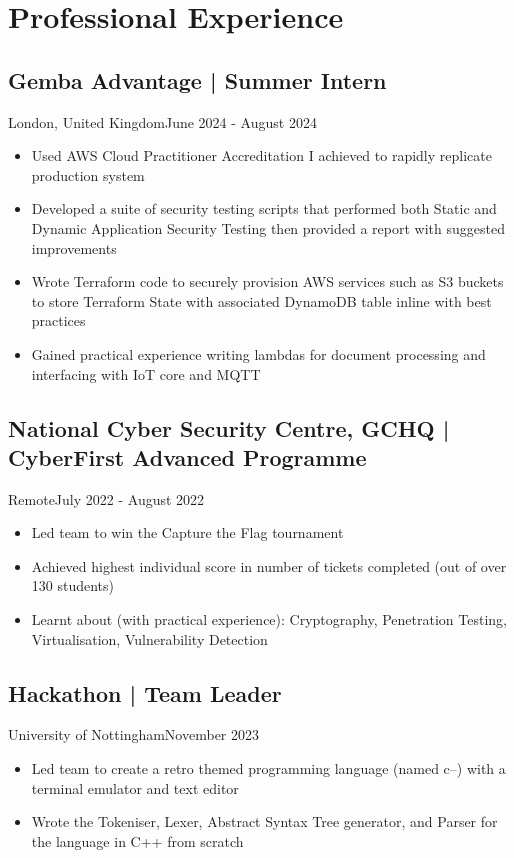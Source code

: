 \section{Professional Experience}
\subsection{Gemba Advantage | Summer Intern}{London, United Kingdom}{June 2024 - August 2024}
\begin{itemize}
    \item Used AWS Cloud Practitioner Accreditation I achieved to rapidly replicate production system
    \item Developed a suite of security testing scripts that performed both Static and Dynamic Application Security Testing then provided a report with suggested improvements
    \item Wrote Terraform code to securely provision AWS services such as S3 buckets to store Terraform State with associated DynamoDB table inline with best practices
    \item Gained practical experience writing lambdas for document processing and interfacing with IoT core and MQTT
\end{itemize}
\subsection{National Cyber Security Centre, GCHQ | CyberFirst Advanced Programme}{Remote}{July 2022 - August 2022}
\begin{itemize}
    \item Led team to win the Capture the Flag tournament
    \item Achieved highest individual score in number of tickets completed (out of over 130 students)
    \item Learnt about (with practical experience): Cryptography, Penetration Testing, Virtualisation, Vulnerability Detection
\end{itemize}
\subsection{Hackathon | Team Leader}{University of Nottingham}{November 2023}
\begin{itemize}
    \item Led team to create a retro themed programming language (named c--) with a terminal emulator and text editor
    \item Wrote the Tokeniser, Lexer, Abstract Syntax Tree generator, and Parser for the language in C++ from scratch
\end{itemize}
\vspace{.3em}
